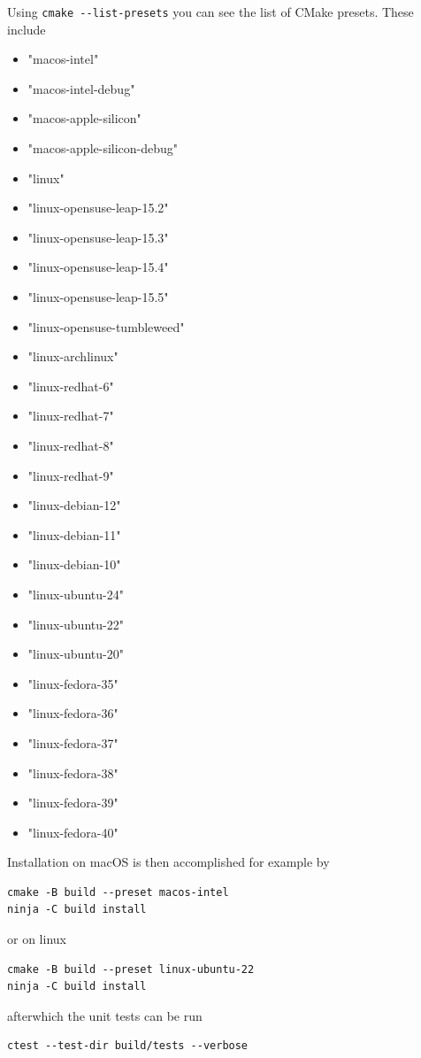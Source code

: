 Using \verb+cmake --list-presets+ you can see the list of CMake presets.
These include
\begin{itemize}
  \item{"macos-intel"}
  \item{"macos-intel-debug"}
  \item{"macos-apple-silicon"}
  \item{"macos-apple-silicon-debug"}
  \item{"linux"}
  \item{"linux-opensuse-leap-15.2"}
  \item{"linux-opensuse-leap-15.3"}
  \item{"linux-opensuse-leap-15.4"}
  \item{"linux-opensuse-leap-15.5"}
  \item{"linux-opensuse-tumbleweed"}
  \item{"linux-archlinux"}
  \item{"linux-redhat-6"}
  \item{"linux-redhat-7"}
  \item{"linux-redhat-8"}
  \item{"linux-redhat-9"}
  \item{"linux-debian-12"}
  \item{"linux-debian-11"}
  \item{"linux-debian-10"}
  \item{"linux-ubuntu-24"}
  \item{"linux-ubuntu-22"}
  \item{"linux-ubuntu-20"}
  \item{"linux-fedora-35"}
  \item{"linux-fedora-36"}
  \item{"linux-fedora-37"}
  \item{"linux-fedora-38"}
  \item{"linux-fedora-39"}
  \item{"linux-fedora-40"}
\end{itemize}

\noindent
Installation on macOS is then accomplished for example by
\begin{framed}
\begin{verbatim}
cmake -B build --preset macos-intel
ninja -C build install
\end{verbatim}
\end{framed}
or on linux
\begin{framed}
\begin{verbatim}
cmake -B build --preset linux-ubuntu-22
ninja -C build install
\end{verbatim}
\end{framed}
afterwhich the unit tests can be run
\begin{framed}
\begin{verbatim}
ctest --test-dir build/tests --verbose
\end{verbatim}
\end{framed}

